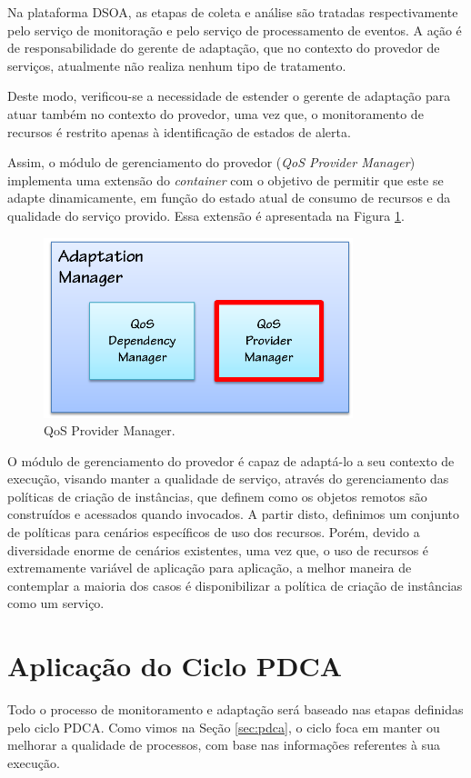 Na plataforma DSOA, as etapas de coleta e análise são tratadas respectivamente pelo serviço de monitoração e pelo serviço de processamento de eventos. A ação é de responsabilidade do gerente de adaptação, que no contexto do provedor de serviços, atualmente não realiza nenhum tipo de tratamento.

Deste modo, verificou-se a necessidade de estender o gerente de adaptação para atuar também no contexto do provedor, uma vez que, o monitoramento de recursos é restrito apenas à identificação de estados de alerta.

Assim, o módulo de gerenciamento do provedor (\textit{QoS Provider Manager}) implementa uma extensão do \textit{container} com o  objetivo de permitir que este se adapte dinamicamente, em função do estado atual de consumo de recursos e da qualidade do serviço provido. Essa extensão é apresentada na Figura \ref{fig:adapt_module}.


\begin{figure}[htp]
\centering
\includegraphics[width=9cm]{chapters/chapter4/adaptation-manager.png}
\caption[QoS Provider Manager]{QoS Provider Manager.}
\label{fig:adapt_module}
\end{figure}

O módulo de gerenciamento do provedor é capaz de adaptá-lo a seu contexto de execução, visando manter a qualidade de serviço, através do gerenciamento das políticas de criação de instâncias, que definem como os objetos remotos são construídos e acessados quando invocados. A partir disto, definimos um conjunto de políticas para cenários específicos de uso dos recursos. Porém, devido a diversidade enorme de cenários existentes, uma vez que, o uso de recursos é extremamente variável de aplicação para aplicação, a melhor maneira de contemplar a maioria dos casos é disponibilizar a política de criação de instâncias como um serviço.

\section{Aplicação do Ciclo PDCA}
Todo o processo de monitoramento e adaptação será baseado nas etapas definidas pelo ciclo PDCA. Como vimos na Seção \ref{sec:pdca}, o ciclo foca em manter ou melhorar a qualidade de processos, com base nas informações referentes à sua execução.

